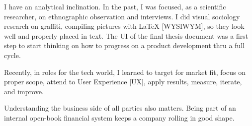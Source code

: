 


I have an analytical inclination. In the past,
I was focused, as a scientific researcher, on ethnographic observation and interviews.  
I did visual sociology research on graffiti, 
compiling pictures 
with \LaTeX $ $ {\scriptsize [WYSIWYM]}, 
so they look well and properly placed in text.
The UI of the final thesis document was a first step to start thinking on how to progress on
a product development thru a full cycle. 
\smallskip

Recently, in roles for the tech  world, I
learned to target for market fit,
focus on proper scope, attend to User Experience {\scriptsize[UX]},
apply results, measure, iterate, and improve. 
\smallskip

Understanding the business side of all parties also matters.
Being part of an internal open-book financial system keeps %
a company rolling in good shape.
\medskip 



%


